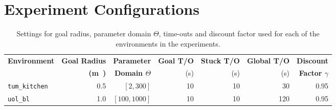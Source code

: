 


\section{Experiment Configurations}
\label{sec:scenarios}

\begin{table}
	\caption{Settings for goal radius, parameter domain $\Theta$, time-outs and discount factor used for each of the environments in the experiments.}
	\label{tab:designer-settings}\centering
	\begin{tabular}{|l|r|r|r|r|r|r|}
		\hline
		\textbf{Environment} & \textbf{Goal Radius} & \textbf{Parameter} & \textbf{Goal T/O} & \textbf{Stuck T/O} & \textbf{Global T/O} & \textbf{Discount}  \\

		& \textbf{(\si\meter)} & \textbf{Domain $\Theta$} & (\si{\second}) & (\si{\second}) & (\si{\second}) & \textbf{Factor $\gamma$}\\
		\hline
		\texttt{tum\_kitchen} & \num{0.5} & $[2, 300]$ & \num{10} & \num{10} & \num{30} & \num{0.95} \\
		\hline
		\texttt{uol\_bl} & \num{1.0} & $[100, 1000]$ & \num{10} & \num{10} & \num{120} & \num{0.95}\\
		\hline
	\end{tabular}
\end{table}

